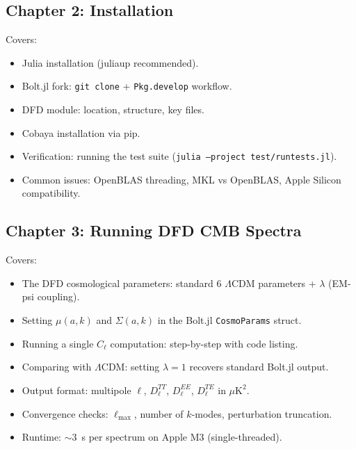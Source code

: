 \documentclass[11pt,a4paper]{article}
\begin{document}
\subsection{Chapter 2: Installation}

Covers:
\begin{itemize}
\item Julia installation (juliaup recommended).
\item Bolt.jl fork: \texttt{git clone} + \texttt{Pkg.develop} workflow.
\item DFD module: location, structure, key files.
\item Cobaya installation via pip.
\item Verification: running the test suite (\texttt{julia --project test/runtests.jl}).
\item Common issues: OpenBLAS threading, MKL vs OpenBLAS, Apple Silicon compatibility.
\end{itemize}

\subsection{Chapter 3: Running DFD CMB Spectra}

Covers:
\begin{itemize}
\item The DFD cosmological parameters: standard 6 $\Lambda$CDM parameters + $\lambda$ (EM-psi coupling).
\item Setting $\mu(a,k)$ and $\Sigma(a,k)$ in the Bolt.jl \texttt{CosmoParams} struct.
\item Running a single $C_\ell$ computation: step-by-step with code listing.
\item Comparing with $\Lambda$CDM: setting $\lambda = 1$ recovers standard Bolt.jl output.
\item Output format: multipole $\ell$, $D_\ell^{TT}$, $D_\ell^{EE}$, $D_\ell^{TE}$ in $\mu\text{K}^2$.
\item Convergence checks: $\ell_{\max}$, number of $k$-modes, perturbation truncation.
\item Runtime: $\sim 3$~s per spectrum on Apple M3 (single-threaded).
\end{itemize}
\end{document}
